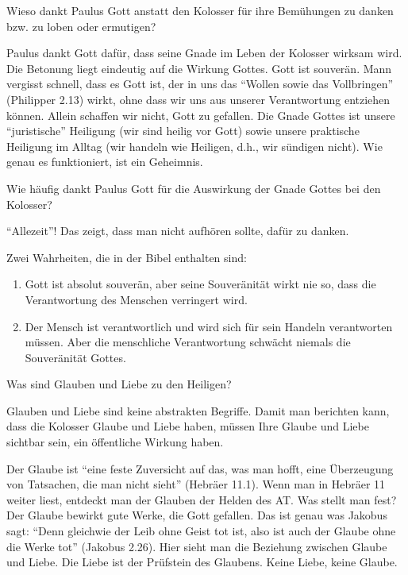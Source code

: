 \documentclass[
  12pt,
]{krantz}
\makeatletter
\providecommand{\tightlist}{%
  \setlength{\itemsep}{0pt}\setlength{\parskip}{0pt}}
\newenvironment{kframe}{%
\medskip{}
\setlength{\fboxsep}{.8em}
 \def\at@end@of@kframe{}%
 \ifinner\ifhmode%
  \def\at@end@of@kframe{\end{minipage}}%
  \begin{minipage}{\columnwidth}%
 \fi\fi%
 \def\FrameCommand##1{\hskip\@totalleftmargin \hskip-\fboxsep
 \colorbox{shadecolor}{##1}\hskip-\fboxsep
     \hskip-\linewidth \hskip-\@totalleftmargin \hskip\columnwidth}%
 \MakeFramed {\advance\hsize-\width
   \@totalleftmargin\z@ \linewidth\hsize
   \@setminipage}}%
 {\par\unskip\endMakeFramed%
 \at@end@of@kframe}
\newenvironment{rmdblock}[1]
  {
  \begin{itemize}
  \renewcommand{\labelitemi}{
    \raisebox{-.7\height}[0pt][0pt]{
      {\setkeys{Gin}{width=3em,keepaspectratio}\texttt{[image: img/\#1]}}
    }
  }
  \setlength{\fboxsep}{1em}
  \begin{kframe}
  \item
  }
  {
  \end{kframe}
  \end{itemize}
  }
\newenvironment{rmddefinition}
  {\begin{rmdblock}{definition}}
  {\end{rmdblock}}
\makeatother
\begin{document}
Wieso dankt Paulus Gott anstatt den Kolosser für ihre Bemühungen zu danken bzw. zu loben oder ermutigen?

Paulus dankt Gott dafür, dass seine Gnade im Leben der Kolosser wirksam wird. Die Betonung liegt eindeutig auf die Wirkung Gottes. Gott ist souverän. Mann vergisst schnell, dass es Gott ist, der in uns das ``Wollen sowie das Vollbringen'' (Philipper 2.13) wirkt, ohne dass wir uns aus unserer Verantwortung entziehen können. Allein schaffen wir nicht, Gott zu gefallen. Die Gnade Gottes ist unsere ``juristische'' Heiligung (wir sind heilig vor Gott) sowie unsere praktische Heiligung im Alltag (wir handeln wie Heiligen, d.h., wir sündigen nicht). Wie genau es funktioniert, ist ein Geheimnis.

Wie häufig dankt Paulus Gott für die Auswirkung der Gnade Gottes bei den Kolosser?

``Allezeit''! Das zeigt, dass man nicht aufhören sollte, dafür zu danken.

\begin{rmddefinition}
Zwei Wahrheiten, die in der Bibel enthalten sind:

\begin{enumerate}
\def\labelenumi{\arabic{enumi}.}
\tightlist
\item
  Gott ist absolut souverän, aber seine Souveränität wirkt nie so, dass
  die Verantwortung des Menschen verringert wird.
\item
  Der Mensch ist verantwortlich und wird sich für sein Handeln
  verantworten müssen. Aber die menschliche Verantwortung schwächt
  niemals die Souveränität Gottes.
\end{enumerate}
\end{rmddefinition}

Was sind Glauben und Liebe zu den Heiligen?

Glauben und Liebe sind keine abstrakten Begriffe. Damit man berichten kann, dass die Kolosser Glaube und Liebe haben, müssen Ihre Glaube und Liebe sichtbar sein, ein öffentliche Wirkung haben.

Der Glaube ist ``eine feste Zuversicht auf das, was man hofft, eine Überzeugung von Tatsachen, die man nicht sieht'' (Hebräer 11.1).
Wenn man in Hebräer 11 weiter liest, entdeckt man der Glauben der Helden des AT. Was stellt man fest? Der Glaube bewirkt gute Werke, die Gott gefallen. Das ist genau was Jakobus sagt: ``Denn gleichwie der Leib ohne Geist tot ist, also ist auch der Glaube ohne die Werke tot'' (Jakobus 2.26). Hier sieht man die Beziehung zwischen Glaube und Liebe. Die Liebe ist der Prüfstein des Glaubens. Keine Liebe, keine Glaube.
\end{document}
